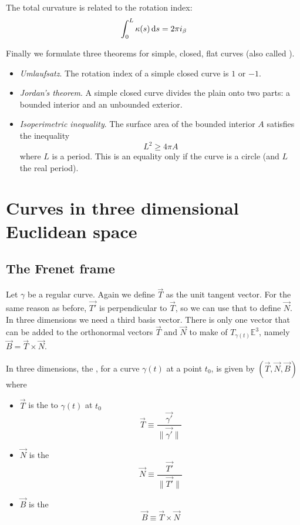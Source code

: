 \begin{eigenschap}
The total curvature is related to the rotation index:
\[ \int_0^L\kappa(s)\operatorname{d \!}{s} = 2\pi i_\beta \]
\end{eigenschap}

Finally we formulate three theorems for simple, closed, flat curves (also called ).
\begin{eigenschap}
\begin{itemize}
\item \textit{Umlaufsatz}. The rotation index of a simple closed curve is $1$ or $-1$.
\item \textit{Jordan's theorem}. A simple closed curve divides the plain onto two parts: a bounded interior and an unbounded exterior.
\item \textit{Isoperimetric inequality}. The surface area of the bounded interior $A$ satisfies the inequality
\[ L^2 \geq 4\pi A \]
where $L$ is a period. This is an equality only if the curve is a circle (and $L$ the real period).
\end{itemize}
\end{eigenschap}

\section{Curves in three dimensional Euclidean space}
\subsection{The Frenet frame}
Let $\gamma$ be a regular curve. Again we define $\vec{T}$ as the unit tangent vector. For the same reason as before, $\vec{T'}$ is perpendicular to $\vec{T}$, so we can use that to define $\vec{N}$. In three dimensions we need a third basis vector. There is only one vector that can be added to the orthonormal vectors $\vec{T}$ and $\vec{N}$ to make  of $T_{\gamma(t)}\mathbb{E}^3$, namely $\vec{B} = \vec{T}\times \vec{N}$.
\begin{definition}
In three dimensions, the , for a curve $\gamma(t)$ at a point $t_0$, is given by $(\vec{T}, \vec{N}, \vec{B})$ where
\begin{itemize}
\item $\vec{T}$ is the  to $\gamma(t)$ at $t_0$
\[ \vec{T} \equiv \frac{\vec{\gamma'}}{\lVert \vec{\gamma'} \lVert} \]
\item $\vec{N}$ is the 
\[ \vec{N} \equiv \frac{\vec{T'}}{\lVert \vec{T'} \lVert} \]
\item $\vec{B}$ is the 
\[ \vec{B} \equiv \vec{T}\times \vec{N} \]
\end{itemize}
\end{definition}

